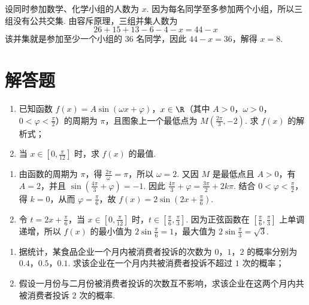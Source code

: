 \begin{solution}
设同时参加数学、化学小组的人数为 \(x\). 因为每名同学至多参加两个小组，所以三组没有公共交集. 由容斥原理，三组并集人数为
\[
26+15+13-6-4-x=44-x
\]
该并集就是参加至少一个小组的 \(36\) 名同学，因此 \(44-x=36\)，解得 \(x=8\).
\end{solution}

\section{解答题}

\begin{problem}
\begin{enumerate}
\item 已知函数 \( f(x) = A \sin (\omega x + \varphi) \)，\( x \in \R \)（其中 \(A > 0\)，\(\omega > 0\)，\(0 < \varphi < \frac{\pi}{2}\)）的周期为 \( \pi \)，且图象上一个最低点为 \( M\left(\frac{2\pi}{3}, -2\right) \). 求 \( f(x) \) 的解析式；
\item 当 \(x \in \left[0, \frac{\pi}{12}\right]\) 时，求 \(f(x)\) 的最值.
\end{enumerate}
\end{problem}

\begin{solution}
\begin{enumerate}
\item 由函数的周期为 \(\pi\)，得 \(\frac{2\pi}{\omega}=\pi\)，所以 \(\omega=2\). 又因 \(M\) 是最低点且 \(A>0\)，有 \(A=2\)，并且 \(\sin\left(\frac{4\pi}{3}+\varphi\right)=-1\). 因此 \(\frac{4\pi}{3}+\varphi=\frac{3\pi}{2}+2k\pi\). 结合 \(0<\varphi<\frac{\pi}{2}\)，得 \(k=0\)，从而 \(\varphi=\frac{\pi}{6}\)，故 \(f(x)=2\sin\left(2x+\frac{\pi}{6}\right)\).
\item 令 \(t=2x+\frac{\pi}{6}\)，当 \(x\in\left[0,\frac{\pi}{12}\right]\) 时，\(t\in\left[\frac{\pi}{6},\frac{\pi}{3}\right]\). 因为正弦函数在 \(\left[\frac{\pi}{6},\frac{\pi}{3}\right]\) 上单调递增，所以 \(f(x)\) 的最小值为 \(2\sin\frac{\pi}{6}=1\)，最大值为 \(2\sin\frac{\pi}{3}=\sqrt{3}\).
\end{enumerate}
\end{solution}

\begin{problem}
\begin{enumerate}
\item 据统计，某食品企业一个月内被消费者投诉的次数为 \(0\)，\(1\)，\(2\) 的概率分别为 \(0.4\)，\(0.5\)，\(0.1\). 求该企业在一个月内共被消费者投诉不超过 \(1\) 次的概率；
\item 假设一月份与二月份被消费者投诉的次数互不影响，求该企业在这两个月内共被消费者投诉 \(2\) 次的概率.
\end{enumerate}
\end{problem}

